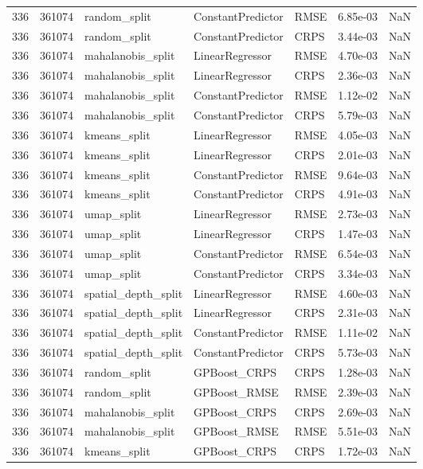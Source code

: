 \begin{tabular}{rrlllrr}
336 & 361074 & random\_split & ConstantPredictor & RMSE & 6.85e-03 & NaN \\
336 & 361074 & random\_split & ConstantPredictor & CRPS & 3.44e-03 & NaN \\
336 & 361074 & mahalanobis\_split & LinearRegressor & RMSE & 4.70e-03 & NaN \\
336 & 361074 & mahalanobis\_split & LinearRegressor & CRPS & 2.36e-03 & NaN \\
336 & 361074 & mahalanobis\_split & ConstantPredictor & RMSE & 1.12e-02 & NaN \\
336 & 361074 & mahalanobis\_split & ConstantPredictor & CRPS & 5.79e-03 & NaN \\
336 & 361074 & kmeans\_split & LinearRegressor & RMSE & 4.05e-03 & NaN \\
336 & 361074 & kmeans\_split & LinearRegressor & CRPS & 2.01e-03 & NaN \\
336 & 361074 & kmeans\_split & ConstantPredictor & RMSE & 9.64e-03 & NaN \\
336 & 361074 & kmeans\_split & ConstantPredictor & CRPS & 4.91e-03 & NaN \\
336 & 361074 & umap\_split & LinearRegressor & RMSE & 2.73e-03 & NaN \\
336 & 361074 & umap\_split & LinearRegressor & CRPS & 1.47e-03 & NaN \\
336 & 361074 & umap\_split & ConstantPredictor & RMSE & 6.54e-03 & NaN \\
336 & 361074 & umap\_split & ConstantPredictor & CRPS & 3.34e-03 & NaN \\
336 & 361074 & spatial\_depth\_split & LinearRegressor & RMSE & 4.60e-03 & NaN \\
336 & 361074 & spatial\_depth\_split & LinearRegressor & CRPS & 2.31e-03 & NaN \\
336 & 361074 & spatial\_depth\_split & ConstantPredictor & RMSE & 1.11e-02 & NaN \\
336 & 361074 & spatial\_depth\_split & ConstantPredictor & CRPS & 5.73e-03 & NaN \\
336 & 361074 & random\_split & GPBoost\_CRPS & CRPS & 1.28e-03 & NaN \\
336 & 361074 & random\_split & GPBoost\_RMSE & RMSE & 2.39e-03 & NaN \\
336 & 361074 & mahalanobis\_split & GPBoost\_CRPS & CRPS & 2.69e-03 & NaN \\
336 & 361074 & mahalanobis\_split & GPBoost\_RMSE & RMSE & 5.51e-03 & NaN \\
336 & 361074 & kmeans\_split & GPBoost\_CRPS & CRPS & 1.72e-03 & NaN \\

\end{tabular}
